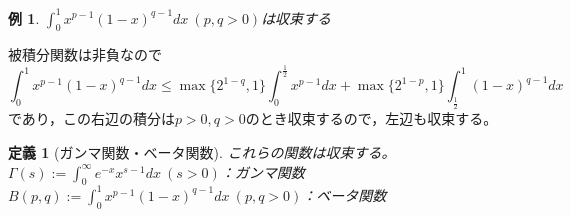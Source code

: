 \documentclass[dvipdfmx,a4j,10pt]{jsarticle}
\makeatletter
\theoremstyle{mystyle1}
\newtheorem{example}[dfn]{例}
\theoremstyle{mystyle2}
\newtheorem{dfn*}{定義}
\renewenvironment{proof}[1][\proofname]{\par
  \pushQED{\qed}%
  \normalfont
  \topsep6\p@\@plus6\p@ \trivlist
  \item[\hskip\labelsep{\bfseries\sffamily #1}]\ignorespaces
}{%
  \popQED\endtrivlist\@endpefalse
}
\renewcommand\proofname{証明}
\makeatother
\begin{document}
\begin{shaded}
    \begin{example}\label{ex-beta}
        $\displaystyle\int_0^1 x^{p-1}(1-x)^{q-1}dx\ (p,q>0)$は収束する\footnotemark
    \end{example}
\end{shaded}
\begin{proof}[例\ref{ex-beta}の証明]
被積分関数は非負なので
\[
\int_0^1 x^{p-1}(1-x)^{q-1}dx\leq\max\{2^{1-q},1\}\int_0^{\frac{1}{2}}x^{p-1}dx+\max\{2^{1-p},1\}\int_{\frac{1}{2}}^1(1-x)^{q-1}dx
\]
であり，この右辺の積分は$p>0,q>0$のとき収束するので，左辺も収束する。

\begin{framed}
    \begin{dfn*}[ガンマ関数・ベータ関数]
        これらの関数は収束する。\\
        $\displaystyle\Gamma(s):=\int_0^\infty e^{-x} x^{s-1}dx\ (s>0)$：ガンマ関数
        $\displaystyle B(p,q):=\int_0^1 x^{p-1}(1-x)^{q-1}dx\ (p,q>0)$：ベータ関数
    \end{dfn*}
\end{framed}

\newpage


\end{proof}
\end{document}
